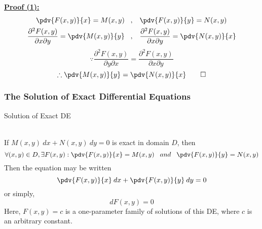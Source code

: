 \underline{\textbf{Proof (1):}}
\begin{align*}
    \pdv{F(x,y)}{x} = M(x,y) \;\;\;&,\;\;\; \pdv{F(x,y)}{y} = N(x,y)  \\
    \frac{\partial^2 F(x,y)}{\partial x \partial y} = \pdv{M(x,y)}{y} \;\;\;&,\;\;\; \frac{\partial^2 F(x,y)}{\partial x \partial y} = \pdv{N(x,y)}{x}
\end{align*}
\[
    \because \frac{\partial^2 F(x,y)}{\partial y \partial x} = \frac{\partial^2 F(x,y)}{\partial x \partial y}
\] \[
    \therefore \pdv{M(x,y)}{y} = \pdv{N(x,y)}{x} \qed
\]

 
\subsubsection{The Solution of Exact Differential Equations}

\begin{theorem}{Solution of Exact DE}
    
    \\If $M(x,y) \: d{x} + N(x,y) \: d{y} = 0$ is exact in domain $D$, then
    \[
        \forall(x,y)\in D, \exists F(x,y) : \pdv{F(x,y)}{x} = M(x,y) \;\;\;and\;\;\;
        \pdv{F(x,y)}{y} = N(x,y)
    \]
    Then the equation may be written \[
        \pdv{F(x,y)}{x} \: d{x} + \pdv{F(x,y)}{y} \: d{y} = 0
    \] or simply, \[
        dF(x,y) = 0
    \]
    Here, $F(x,y) = c$ is a one-parameter family of solutions of this DE, where $c$ is an arbitrary constant.
\end{theorem}













